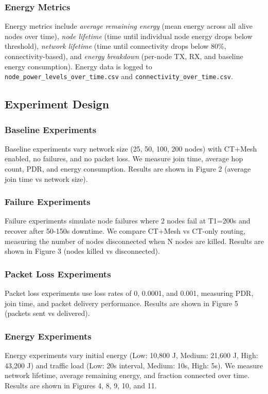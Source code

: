 \documentclass[conference]{IEEEtran}
\begin{document}
\subsubsection{Energy Metrics}
Energy metrics include \emph{average remaining energy} (mean energy across all alive nodes over time), \emph{node lifetime} (time until individual node energy drops below threshold), \emph{network lifetime} (time until connectivity drops below 80\%, connectivity-based), and \emph{energy breakdown} (per-node TX, RX, and baseline energy consumption). Energy data is logged to \texttt{node\_power\_levels\_over\_time.csv} and \texttt{connectivity\_over\_time.csv}.

\subsection{Experiment Design}

\subsubsection{Baseline Experiments}
Baseline experiments vary network size (25, 50, 100, 200 nodes) with CT+Mesh enabled, no failures, and no packet loss. We measure join time, average hop count, PDR, and energy consumption. Results are shown in Figure 2 (average join time vs network size).

\subsubsection{Failure Experiments}
Failure experiments simulate node failures where 2 nodes fail at T1=200s and recover after 50-150s downtime. We compare CT+Mesh vs CT-only routing, measuring the number of nodes disconnected when N nodes are killed. Results are shown in Figure 3 (nodes killed vs disconnected).

\subsubsection{Packet Loss Experiments}
Packet loss experiments use loss rates of 0, 0.0001, and 0.001, measuring PDR, join time, and packet delivery performance. Results are shown in Figure 5 (packets sent vs delivered).

\subsubsection{Energy Experiments}
Energy experiments vary initial energy (Low: 10,800 J, Medium: 21,600 J, High: 43,200 J) and traffic load (Low: 20s interval, Medium: 10s, High: 5s). We measure network lifetime, average remaining energy, and fraction connected over time. Results are shown in Figures 4, 8, 9, 10, and 11.
\end{document}
